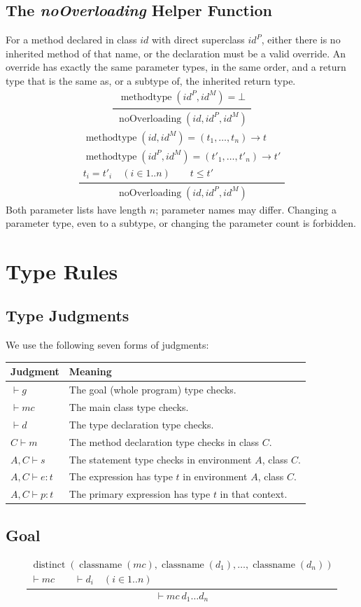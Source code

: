 \documentclass[11pt,a4paper]{article}
\newcommand{\mt}{\operatorname{methodtype}}
\newcommand{\cn}{\operatorname{classname}}
\newcommand{\dist}{\operatorname{distinct}}
\newcommand{\noov}{\operatorname{noOverloading}}
\newcommand{\id}{\mathit{id}}
\newcommand{\ruleeq}[3]{\begin{equation}\frac{\begin{gathered}#2\end{gathered}}{\begin{gathered}#3\end{gathered}}\tag{#1}\end{equation}}
\begin{document}
\subsection{The \textit{noOverloading} Helper Function}
For a method declared in class $\id$ with direct superclass $\id^P$, either
there is no inherited method of that name, or the declaration must be a valid
override. An override has exactly the same parameter types, in the same order,
and a return type that is the same as, or a subtype of, the inherited return type.
\ruleeq{16a}{\mt(\id^P,\id^M)=\bot}{\noov(\id,\id^P,\id^M)}
\ruleeq{16b}{\mt(\id,\id^M)=(t_1,\ldots,t_n)\to t\\
\mt(\id^P,\id^M)=(t'_1,\ldots,t'_n)\to t'\\
t_i=t'_i\quad(i\in1..n)\qquad t\leq t'}{\noov(\id,\id^P,\id^M)}
Both parameter lists have length $n$; parameter names may differ. Changing a
parameter type, even to a subtype, or changing the parameter count is forbidden.

\newpage
\section{Type Rules}
\subsection{Type Judgments}
We use the following seven forms of judgments:
\begin{center}
\begin{tabular}{ll}
\toprule
Judgment & Meaning\\\midrule
$\vdash g$ & The goal (whole program) type checks.\\
$\vdash mc$ & The main class type checks.\\
$\vdash d$ & The type declaration type checks.\\
$C\vdash m$ & The method declaration type checks in class $C$.\\
$A,C\vdash s$ & The statement type checks in environment $A$, class $C$.\\
$A,C\vdash e:t$ & The expression has type $t$ in environment $A$, class $C$.\\
$A,C\vdash p:t$ & The primary expression has type $t$ in that context.\\
\bottomrule
\end{tabular}
\end{center}
\subsection{Goal}
\ruleeq{17}{\dist(\cn(mc),\cn(d_1),\ldots,\cn(d_n))\\
\vdash mc\qquad\vdash d_i\quad(i\in1..n)}{\vdash mc\ d_1\ldots d_n}
\end{document}
